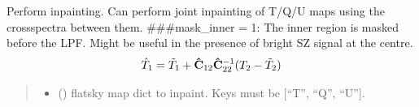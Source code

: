 \documentclass[letterpaper,10pt,english]{sphinxmanual}
\begin{document}
\begin{fulllineitems}
\label{\detokenize{inpaint:inpaint.inpainting}}
\pysigstartsignatures
{}
\pysigstopsignatures
\sphinxAtStartPar
Perform inpainting. Can perform joint inpainting of T/Q/U maps using the cross\sphinxhyphen{}spectra between them.
\#\#\#mask\_inner = 1: The inner region is masked before the LPF. Might be useful in the presence of bright SZ signal at the centre.
\begin{equation*}
\begin{split}\hat{T}_{1} = \tilde{T}_{1} + {\bf \hat{C}}_{12}  {\bf \hat{C}}_{22}^{-1} (T_{2} - \tilde{T}_{2})\end{split}
\end{equation*}\begin{quote}\begin{description}
\begin{itemize}
\item {} 
\sphinxAtStartPar
{} () \textendash{} flatsky map dict to inpaint.
Keys must be {[}“T”, “Q”, “U”{]}.


\end{itemize}
\end{description}
\end{quote}
\end{fulllineitems}
\end{document}
